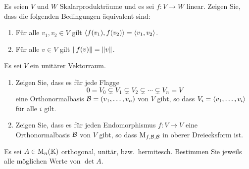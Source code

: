 \documentclass[a4paper, 10pt]{scrartcl}
\begin{document}
\begin{question}[subtitle = Charakterisierung linearer Isometrien]
  Es seien $V$ und $W$ Skalarprodukträume und es sei $f \colon V \to W$ linear.
  Zeigen Sie, dass die folgenden Bedingungen äquivalent sind:
  \begin{enumerate}
    \item
      Für alle $v_1, v_2 \in V$ gilt $\left\langle f(v_1), f(v_2) \right\rangle = \left\langle v_1, v_2 \right\rangle$.
    \item
      Für alle $v \in V$ gilt $\left\| f(v) \right\| = \left\| v \right\|$.
  \end{enumerate}
\end{question}





\begin{question}[subtitle = Trigonalisierung durch Orthonormalbasen]
  Es sei $V$ ein unitärer Vektorraum.
  \begin{enumerate}
    \item
      Zeigen Sie, dass es für jede Flagge
      \[
                    0
        =           V_0
        \subsetneq  V_1
        \subsetneq  V_2
        \subsetneq  \dotsb
        \subsetneq  V_n
        =           V
      \]
      eine Orthonormalbasis $\mathcal{B} = (v_1, \dotsc, v_n)$ von $V$ gibt, so dass $V_i = \left\langle v_1, \dotsc, v_i \right\rangle$ für alle $i$ gilt.
    \item
      Zeigen Sie, dass es für jeden Endomorphismus $f \colon V \to V$ eine Orthonormalbasis $\mathcal{B}$ von $V$ gibt, so dass $\operatorname{M}_{f, \mathcal{B}, \mathcal{B}}$ in oberer Dreiecksform ist.
  \end{enumerate}
\end{question}





\begin{question}[subtitle = Determinanten]
  Es sei $A \in \operatorname{M}_{n}(\mathbb{K})$ orthogonal, unitär, bzw.\ hermitesch.
  Bestimmen Sie jeweils alle möglichen Werte von $\det A$.
\end{question}
\end{document}
